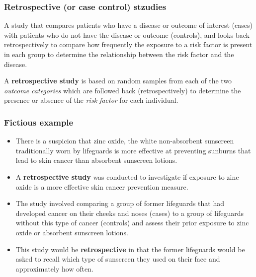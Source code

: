 \documentclass[a4paper]{article}
\begin{document}
\subsubsection{Retrospective (or case control) stzudies}
A study that compares patients who have a disease or outcome of interest (cases) with patients who do not have the disease or outcome (controls), and looks back retrospectively to compare how frequently the exposure to a risk factor is present in each group to determine the relationship between the risk factor and the disease.
\begin{goldbox}
	A \textbf{retrospective study} is based on random samples from each of the two \textit{outcome categories} which are followed back (retrospectively) to determine the presence or absence of the \textit{risk factor} for each individual.
\end{goldbox}
\subsubsection{Fictious example}
\begin{itemize}
	\item There is a suspicion that zinc oxide, the white non-absorbent sunscreen traditionally worn by lifeguards is more effective at preventing sunburns that lead to skin cancer than absorbent sunscreen lotions.
	\item A \textbf{retrospective study} was conducted to investigate if exposure to zinc oxide is a more effective skin cancer prevention measure.
	\item The study involved comparing a group of former lifeguards that had developed cancer on their cheeks and noses (cases) to a group of lifeguards without this type of cancer (controls) and assess their prior exposure to zinc oxide or absorbent sunscreen lotions.
	\item This study would be \textbf{retrospective} in that the former lifeguards would be asked to recall which type of sunscreen they used on their face and approximately how often.
\end{itemize}
\end{document}
